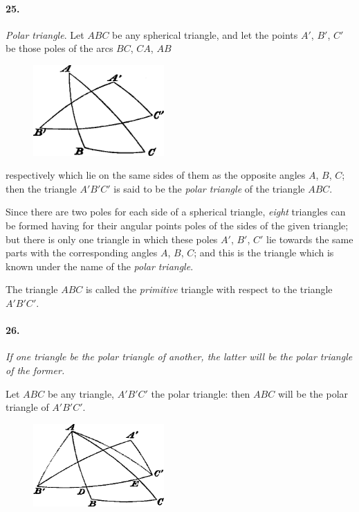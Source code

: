 \documentclass{book}[2004/02/16]
\begin{document}
\begin{mainmatter}
\begin{spacing}{1.3}
\paragraph{25.} \textit{Polar triangle}. Let $ABC$ be any spherical triangle, and
let the points $A'$, $B'$, $C'$ be those poles of the arcs $BC$, $CA$, $AB$
\begin{figure}[htp]
\centering
\includegraphics[width=5.0cm]{images/020fc}
\end{figure}
respectively which lie on the same sides of them as the opposite
angles $A$, $B$, $C$; then the triangle $A'B'C'$ is said to be the \textit{polar
triangle} of the triangle $ABC$.

Since there are two poles for each side of a spherical triangle,
\textit{eight} triangles can be formed having for their angular points poles
of the sides of the given triangle; but there is only one triangle in
which these poles $A'$, $B'$, $C'$ lie towards the same parts with the
corresponding angles $A$, $B$, $C$; and this is the triangle which is
known under the name of the \textit{polar triangle}.

The triangle $ABC$ is called the \textit{primitive} triangle with respect
to the triangle $A'B'C'$.

\paragraph{26.} \textit{If one triangle be the polar triangle of another, the latter
will be the polar triangle of the former.}

Let $ABC$ be any triangle, $A'B'C'$ the polar triangle: then $ABC$
will be the polar triangle of $A'B'C'$.
\begin{figure}[htp]
\centering
\includegraphics[width=5.0cm]{images/021fc}
\end{figure}


\end{spacing}
\end{mainmatter}
\end{document}
